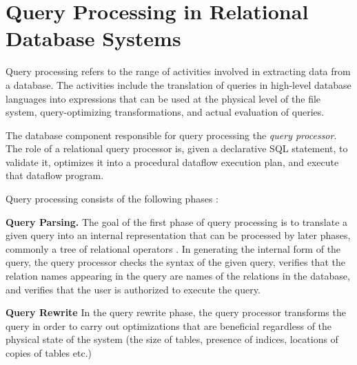 \section{Query Processing in Relational Database Systems}

Query processing refers to the range of activities involved in extracting data from a database.
The activities include the translation of queries in high-level database languages into expressions that can be used at
the physical level of the file system, query-optimizing transformations, and actual evaluation of queries.

The database component responsible for query processing the \textit{query processor}.
The role of a relational query processor is, given a declarative SQL statement, to validate it, optimizes it into a
procedural dataflow execution plan, and execute that dataflow program.

Query processing consists of the following phases \cite{hellerstein:databasearchitecture, kossmann:distqeuryprocessing}:

\bigskip
\noindent
\textbf{Query Parsing.}
The goal of the first phase of query processing is to translate a given query into an internal representation that can
be processed by later phases, commonly a tree of relational operators \cite{silberschatz:dbbook}.
In generating the internal form of the query,
the query processor checks the syntax of the given query,
verifies that the relation names appearing in the query are names of the relations in the database,
and verifies that the user is authorized to execute the query.

\bigskip
\noindent
\textbf{Query Rewrite}
In the query rewrite phase, the query processor transforms the query in order to carry out optimizations that are
beneficial regardless of the physical state of the system
(the size of tables, presence of indices, locations of copies of tables etc.)

